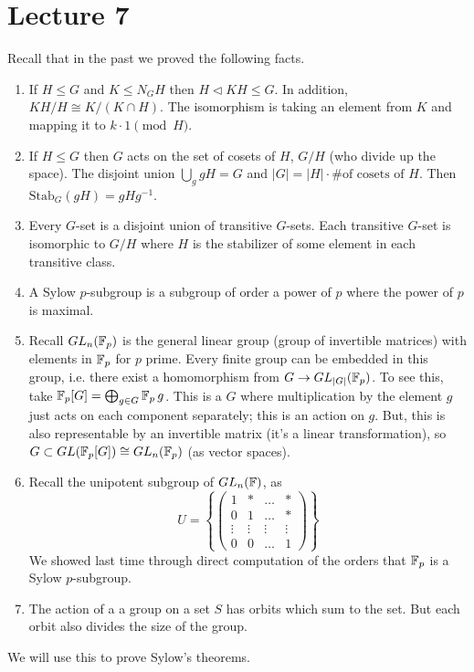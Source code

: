 \section{Lecture 7}
Recall that in the past we proved the following facts.
\begin{enumerate}
\item If $H \le G$ and $K \le N_{G} H$ then $H \triangleleft KH \le G$.
In addition, $KH/H \cong K/(K \cap H)$. The isomorphism is taking an element from $K$ and mapping it to $k\cdot 1 \pmod{H}$.
\item If $H \le G$ then $G$ acts on the set of cosets of $H$, $G/H$ (who divide up the space).
The disjoint union $\bigcup_g gH = G$ and $|G| = |H| \cdot \text{\# of cosets of $H$}$.
Then $\text{Stab}_G(gH) = gHg^{-1}$.
\item Every $G$-set is a disjoint union of transitive $G$-sets. Each transitive $G$-set is isomorphic to $G/H$ where
$H$ is the stabilizer of some element in each transitive class.
\item A Sylow $p$-subgroup is a subgroup of order a power of $p$ where the power of $p$ is maximal.
\item Recall $GL_n(\operatorname{\mathbb{F}}_p)$ is the general linear group (group of invertible matrices) with elements in $\operatorname{\mathbb{F}}_p$ for $p$ prime.
Every finite group can be embedded in this group, i.e. there exist a homomorphism from $G \to GL_{|G|}(\operatorname{\mathbb{F}}_p)$.
To see this, take $\operatorname{\mathbb{F}}_p[G] = \bigoplus_{g \in G} \operatorname{\mathbb{F}}_p g$.
This is a $G$ where multiplication by the element $g$ just acts on each component separately; this is an action on $g$.
But, this is also representable by an invertible matrix (it's a linear transformation), so $G \subset GL(\operatorname{\mathbb{F}}_p[G]) \cong GL_n(\operatorname{\mathbb{F}}_p)$ (as vector spaces).
\item Recall the unipotent subgroup of $GL_n(\operatorname{\mathbb{F}})$, as
\[ U = \left\{ \begin{pmatrix} 1 & * & \dots & * \\
0 & 1& \dots & * \\
\vdots & \vdots & \vdots & \vdots \\
0 & 0 & \dots & 1 \end{pmatrix} \right\} \]
We showed last time through direct computation of the orders that $\operatorname{\mathbb{F}}_p$ is a Sylow $p$-subgroup.
\item The action of a a group on a set $S$ has orbits which sum to the set. But each orbit also divides the size of the group.
\end{enumerate}
We will use this to prove Sylow's theorems.
